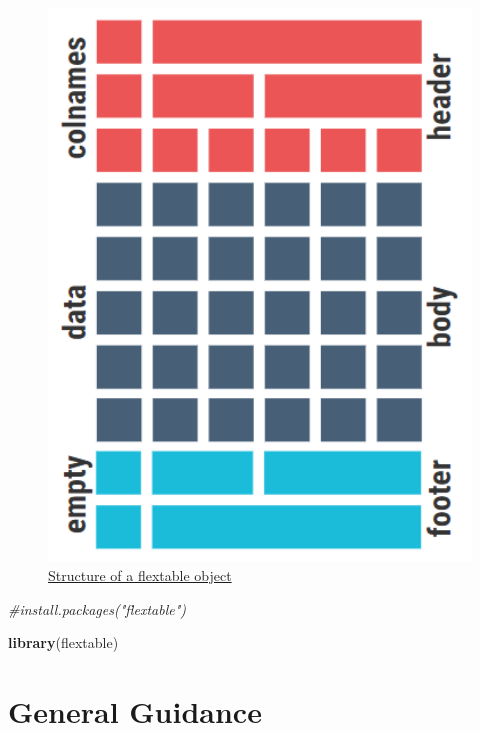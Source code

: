 \documentclass[
]{book}
\newenvironment{Shaded}{\begin{snugshade}}{\end{snugshade}}
\newcommand{\CommentTok}[1]{\textcolor[rgb]{0.56,0.35,0.01}{\textit{#1}}}
\newcommand{\KeywordTok}[1]{\textcolor[rgb]{0.13,0.29,0.53}{\textbf{#1}}}
\newcommand{\NormalTok}[1]{#1}
\begin{document}
\begin{figure}

{\centering \includegraphics[width=5.18in]{img/flextable_object} 

}

\caption{\href{https://ardata-fr.github.io/flextable-book/design.html\#table-parts}{Structure of a flextable object}}\label{fig:unnamed-chunk-2}
\end{figure}

\begin{Shaded}
\begin{Highlighting}[]
\CommentTok{#install.packages("flextable")}

\KeywordTok{library}\NormalTok{(flextable)}
\end{Highlighting}
\end{Shaded}

\hypertarget{general-guidance}{%
\section{General Guidance}\label{general-guidance}}
\end{document}
